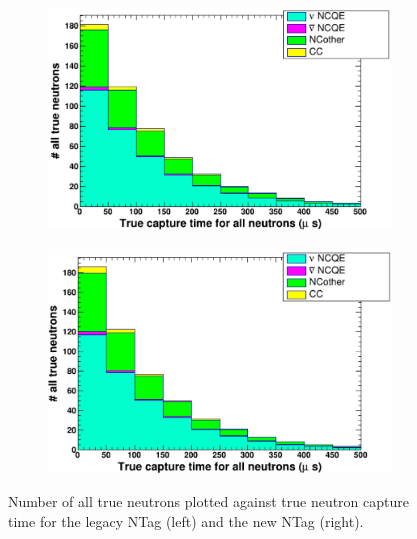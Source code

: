 \begin{figure}
    \centering
     \begin{subfigure}[b]{0.49\linewidth}
      \includegraphics[width=\linewidth]{Figures/TrueCapTimeReductionLegacy.PNG}
     \end{subfigure}
     \begin{subfigure}[b]{0.49\linewidth}
       \includegraphics[width=\linewidth]{Figures/TrueCapTimeReductionNew.PNG}
      \end{subfigure}
      \caption{Number of all true neutrons plotted against true neutron capture time for the legacy NTag (left) and the new NTag (right).}
      \label{fig:TruCapTimeReduction}
\end{figure}

